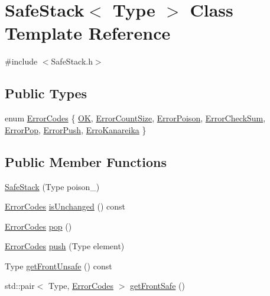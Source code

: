 \hypertarget{classSafeStack}{}\section{Safe\+Stack$<$ Type $>$ Class Template Reference}
\label{classSafeStack}


{\ttfamily \#include $<$Safe\+Stack.\+h$>$}

\subsection*{Public Types}
\begin{DoxyCompactItemize}
\item 
enum \hyperlink{classSafeStack_a3a6ee072918bd0a2c09fa0ea12c1ab64}{Error\+Codes} \{ \newline
\hyperlink{classSafeStack_a3a6ee072918bd0a2c09fa0ea12c1ab64a93f2888c3bca456c946b0ccab748c528}{OK}, 
\hyperlink{classSafeStack_a3a6ee072918bd0a2c09fa0ea12c1ab64a0c945d7ee858c618581c0880fa9c90ec}{Error\+Count\+Size}, 
\hyperlink{classSafeStack_a3a6ee072918bd0a2c09fa0ea12c1ab64a1dae85291dc4c12d33f7a19f5691428b}{Error\+Poison}, 
\hyperlink{classSafeStack_a3a6ee072918bd0a2c09fa0ea12c1ab64ab01666e8811782433f76bb840a9546db}{Error\+Check\+Sum}, 
\newline
\hyperlink{classSafeStack_a3a6ee072918bd0a2c09fa0ea12c1ab64ad5ec78a91bea5a0c4287a33bf641694d}{Error\+Pop}, 
\hyperlink{classSafeStack_a3a6ee072918bd0a2c09fa0ea12c1ab64a604e5836364af75dcb5fadf5b8bb158d}{Error\+Push}, 
\hyperlink{classSafeStack_a3a6ee072918bd0a2c09fa0ea12c1ab64a4b7d6f3ca4bc8af6d813a8e9b97f1592}{Erro\+Kanareika}
 \}
\end{DoxyCompactItemize}
\subsection*{Public Member Functions}
\begin{DoxyCompactItemize}
\item 
\hyperlink{classSafeStack_a09eef1ed7a4e2b0486d4991bc23ea78f}{Safe\+Stack} (Type poison\+\_\+)
\item 
\hyperlink{classSafeStack_a3a6ee072918bd0a2c09fa0ea12c1ab64}{Error\+Codes} \hyperlink{classSafeStack_a6ba7568bccbbd336aa7f6ee6102cd411}{is\+Unchanged} () const
\item 
\hyperlink{classSafeStack_a3a6ee072918bd0a2c09fa0ea12c1ab64}{Error\+Codes} \hyperlink{classSafeStack_a7add18e30f467b9b08233feeed6544df}{pop} ()
\item 
\hyperlink{classSafeStack_a3a6ee072918bd0a2c09fa0ea12c1ab64}{Error\+Codes} \hyperlink{classSafeStack_a4ecd17feae41fe142535f281a80a6a6c}{push} (Type element)
\item 
Type \hyperlink{classSafeStack_ae6e2abc9e3718a8f426ad55fff7720c2}{get\+Front\+Unsafe} () const
\item 
std\+::pair$<$ Type, \hyperlink{classSafeStack_a3a6ee072918bd0a2c09fa0ea12c1ab64}{Error\+Codes} $>$ \hyperlink{classSafeStack_a5b4c56ff55c462bd746f4f36258d46e0}{get\+Front\+Safe} ()
\end{DoxyCompactItemize}


